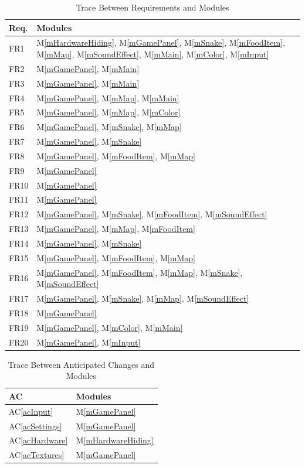 \documentclass[12pt, titlepage]{article}
\newcommand{\acref}[1]{AC\ref{#1}}
\newcommand{\mref}[1]{M\ref{#1}}
\begin{document}
\begin{table}[H]
\centering
\begin{tabular}{p{} p{}}
\toprule
\textbf{Req.} & \textbf{Modules}\\
\midrule
FR1 & \mref{mHardwareHiding}, \mref{mGamePanel}, \mref{mSnake}, \mref{mFoodItem}, \mref{mMap}, \mref{mSoundEffect}, \mref{mMain}, \mref{mColor}, \mref{mInput}\\
FR2 & \mref{mGamePanel}, \mref{mMain}\\
FR3 & \mref{mGamePanel}, \mref{mMain}\\
FR4 & \mref{mGamePanel}, \mref{mMap}, \mref{mMain}\\
FR5 & \mref{mGamePanel}, \mref{mMap}, \mref{mColor}\\
FR6 & \mref{mGamePanel}, \mref{mSnake}, \mref{mMap}\\
FR7 & \mref{mGamePanel}, \mref{mSnake}\\
FR8 & \mref{mGamePanel}, \mref{mFoodItem}, \mref{mMap}\\
FR9 & \mref{mGamePanel}\\
FR10 & \mref{mGamePanel}\\
FR11 & \mref{mGamePanel}\\
FR12 & \mref{mGamePanel}, \mref{mSnake}, \mref{mFoodItem}, \mref{mSoundEffect}\\
FR13 & \mref{mGamePanel}, \mref{mMap}, \mref{mFoodItem}\\
FR14 & \mref{mGamePanel}, \mref{mSnake}\\
FR15 & \mref{mGamePanel}, \mref{mFoodItem}, \mref{mMap}\\
FR16 & \mref{mGamePanel}, \mref{mFoodItem}, \mref{mMap}, \mref{mSnake}, \mref{mSoundEffect}\\
FR17 & \mref{mGamePanel}, \mref{mSnake}, \mref{mMap}, \mref{mSoundEffect}\\
FR18 & \mref{mGamePanel}\\
FR19 & \mref{mGamePanel}, \mref{mColor}, \mref{mMain}\\
FR20 & \mref{mGamePanel}, \mref{mInput}\\
\bottomrule
\end{tabular}
\caption{Trace Between Requirements and Modules}
\label{TblRT}
\end{table}

\begin{table}[H]
\centering
\begin{tabular}{p{} p{}}
\toprule
\textbf{AC} & \textbf{Modules}\\
\midrule
\acref{acInput} & \mref{mGamePanel}\\
\acref{acSettings} & \mref{mGamePanel}\\
\acref{acHardware} & \mref{mHardwareHiding}\\
\acref{acTextures} & \mref{mGamePanel}\\
\bottomrule
\end{tabular}
\caption{Trace Between Anticipated Changes and Modules}
\label{TblACT}
\end{table}
\end{document}
